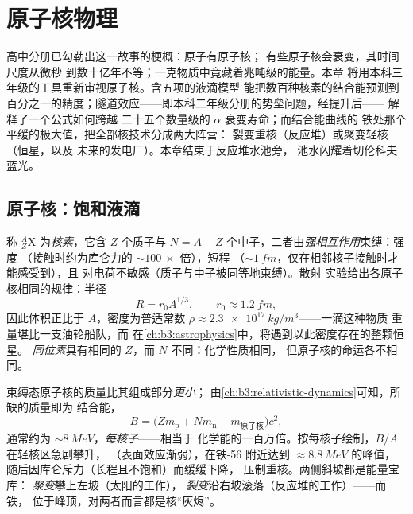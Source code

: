  \chapter{原子核物理}\label{ch:b3:nuclear-physics}


高中分册已勾勒出这一故事的梗概：原子有原子核；
有些原子核会衰变，其时间尺度从微秒
到数十亿年不等；一克物质中竟藏着兆吨级的能量。本章
将用本科三年级的工具重新审视原子核。含五项的液滴模型
能把数百种核素的结合能预测到
百分之一的精度；隧道效应——即本科二年级分册的势垒问题，经提升后——
解释了一个公式如何跨越
二十五个数量级的 $\alpha$ 衰变寿命；而结合能曲线的
铁处那个平缓的极大值，把全部核技术分成两大阵营：
裂变重核（反应堆）或聚变轻核（恒星，以及
未来的发电厂）。本章结束于反应堆水池旁，
池水闪耀着切伦科夫蓝光。

\section{原子核：饱和液滴}

\begin{definition}[核素、大小与密度]\label{def:b3:nuclear-physics:nuclide}
称 $^{A}_{Z}\text{X}$ 为\emph{核素}，它含 $Z$ 个质子与 $N = A -
Z$ 个中子，二者由\emph{强相互作用}束缚：强度
（接触时约为库仑力的 ${\sim}\qty{100}{}\times$ 倍），短程
（${\sim}\qty{1}{fm}$，仅在相邻核子接触时才能感受到），且
对电荷不敏感（质子与中子被同等地束缚）。散射
实验给出各原子核相同的规律：半径
\[
R = r_0A^{1/3} , \qquad r_0 \approx \qty{1.2}{fm} ,
\]
因此体积正比于 $A$，密度为普适常数
$\rho \approx \qty{2.3e17}{kg/m^3}$——一滴这种物质
重量堪比一支油轮船队，而
在\cref{ch:b3:astrophysics}中，将遇到以此密度存在的整颗恒星。
\emph{同位素}具有相同的 $Z$，而 $N$ 不同：化学性质相同，
但原子核的命运各不相同。
\end{definition}

\begin{proposition}[质量亏损与结合能]\label{prop:b3:nuclear-physics:binding}
束缚态原子核的质量比其组成部分\emph{更小}；
由\cref{ch:b3:relativistic-dynamics}可知，所缺的质量即为
结合能，
\[
B = \big(Zm_{\text{p}} + Nm_{\text{n}} - m_{\text{原子核}}\big)c^2 ,
\]
通常约为 ${\sim}\qty{8}{MeV}$，\emph{每核子}——相当于
化学能的一百万倍。按每核子绘制，$B/A$ 在轻核区急剧攀升，
（表面效应渐弱），在铁-56 附近达到 $\approx\qty{8.8}{MeV}$ 的峰值，
随后因库仑斥力（长程且不饱和）而缓缓下降，
压制重核。两侧斜坡都是能量宝库：
\emph{聚变}攀上左坡（太阳的工作），
\emph{裂变}沿右坡滚落（反应堆的工作）——而铁，
位于峰顶，对两者而言都是核“灰烬”。
\end{proposition}

